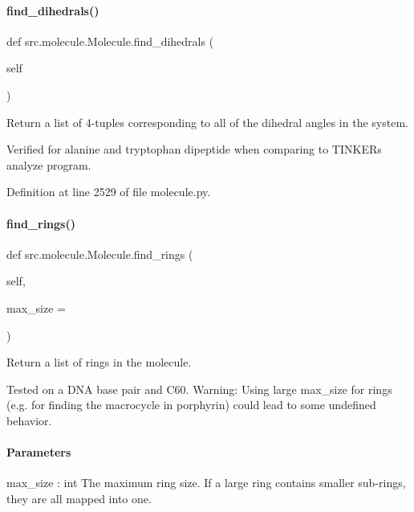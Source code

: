 \paragraph{\texorpdfstring{find\+\_\+dihedrals()}{find\_dihedrals()}}
{\footnotesize\ttfamily def src.\+molecule.\+Molecule.\+find\+\_\+dihedrals (\begin{DoxyParamCaption}\item[{}]{self }\end{DoxyParamCaption})}



Return a list of 4-\/tuples corresponding to all of the dihedral angles in the system. 

Verified for alanine and tryptophan dipeptide when comparing to T\+I\+N\+K\+ER\textquotesingle{}s analyze program. 

Definition at line 2529 of file molecule.\+py.

\mbox{\label{classsrc_1_1molecule_1_1Molecule_abb42e2d8a17fac1eb2a8912e1ea3a9a7}} 
\paragraph{\texorpdfstring{find\+\_\+rings()}{find\_rings()}}
{\footnotesize\ttfamily def src.\+molecule.\+Molecule.\+find\+\_\+rings (\begin{DoxyParamCaption}\item[{}]{self,  }\item[{}]{max\+\_\+size = {} }\end{DoxyParamCaption})}



Return a list of rings in the molecule. 

Tested on a D\+NA base pair and C60. Warning\+: Using large max\+\_\+size for rings (e.\+g. for finding the macrocycle in porphyrin) could lead to some undefined behavior.

\paragraph*{Parameters }

max\+\_\+size \+: int The maximum ring size. If a large ring contains smaller sub-\/rings, they are all mapped into one.

